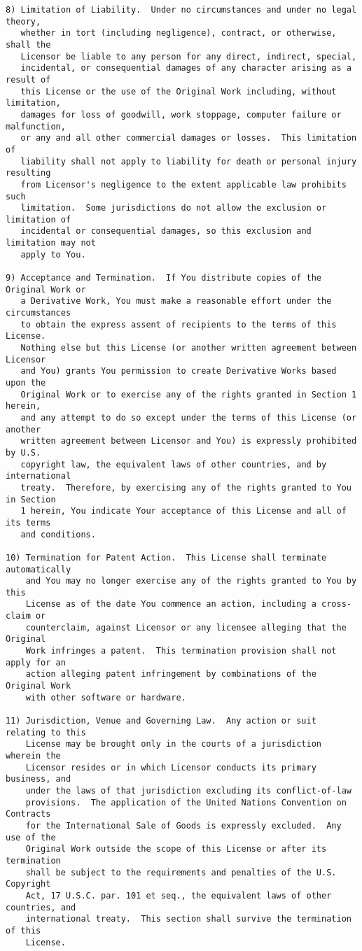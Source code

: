 \begin{verbatim}
8) Limitation of Liability.  Under no circumstances and under no legal theory,
   whether in tort (including negligence), contract, or otherwise, shall the
   Licensor be liable to any person for any direct, indirect, special, 
   incidental, or consequential damages of any character arising as a result of
   this License or the use of the Original Work including, without limitation,
   damages for loss of goodwill, work stoppage, computer failure or malfunction,
   or any and all other commercial damages or losses.  This limitation of
   liability shall not apply to liability for death or personal injury resulting
   from Licensor's negligence to the extent applicable law prohibits such
   limitation.  Some jurisdictions do not allow the exclusion or limitation of
   incidental or consequential damages, so this exclusion and limitation may not
   apply to You.

9) Acceptance and Termination.  If You distribute copies of the Original Work or
   a Derivative Work, You must make a reasonable effort under the circumstances
   to obtain the express assent of recipients to the terms of this License. 
   Nothing else but this License (or another written agreement between Licensor
   and You) grants You permission to create Derivative Works based upon the
   Original Work or to exercise any of the rights granted in Section 1 herein,
   and any attempt to do so except under the terms of this License (or another
   written agreement between Licensor and You) is expressly prohibited by U.S. 
   copyright law, the equivalent laws of other countries, and by international
   treaty.  Therefore, by exercising any of the rights granted to You in Section
   1 herein, You indicate Your acceptance of this License and all of its terms
   and conditions.

10) Termination for Patent Action.  This License shall terminate automatically
    and You may no longer exercise any of the rights granted to You by this 
    License as of the date You commence an action, including a cross-claim or
    counterclaim, against Licensor or any licensee alleging that the Original
    Work infringes a patent.  This termination provision shall not apply for an
    action alleging patent infringement by combinations of the Original Work
    with other software or hardware.

11) Jurisdiction, Venue and Governing Law.  Any action or suit relating to this
    License may be brought only in the courts of a jurisdiction wherein the
    Licensor resides or in which Licensor conducts its primary business, and
    under the laws of that jurisdiction excluding its conflict-of-law
    provisions.  The application of the United Nations Convention on Contracts
    for the International Sale of Goods is expressly excluded.  Any use of the
    Original Work outside the scope of this License or after its termination
    shall be subject to the requirements and penalties of the U.S.  Copyright
    Act, 17 U.S.C. par. 101 et seq., the equivalent laws of other countries, and
    international treaty.  This section shall survive the termination of this
    License.


\end{verbatim}
